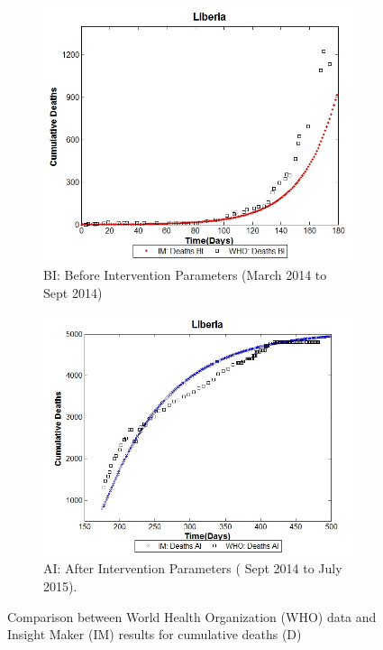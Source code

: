 \begin{figure}[h!]
 \centering 
 \begin{subfigure}[b]{1\textwidth}
  \includegraphics[width=\textwidth]{LB_BI_SD_WHO_IM} \caption{BI: Before Intervention Parameters (March 2014  to Sept 2014)} \label{fig:LB_BI_SD_WHO_IM} \end{subfigure}
 \hspace{.1cm}
\begin{subfigure}[b]{1\textwidth}
 \includegraphics[width=\textwidth]{LB_AI_SD_WHO_IM} \caption{AI: After Intervention Parameters  ( Sept 2014 to July 2015).} \label{fig:LB_AI_SD_WHO_IM} \end{subfigure} 
\caption{Comparison between World Health Organization (WHO) data and Insight Maker (IM) results for cumulative deaths (D)}
\label{fig:LB_IM_WHO} 
\end{figure}



